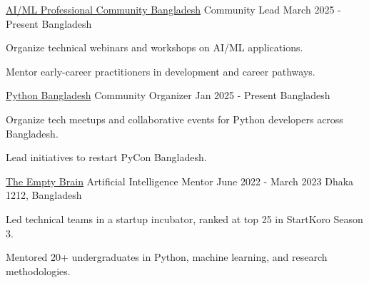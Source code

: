 


\begin{cventries}
\cventry
    {\href{https://aimlcommunity.pythonbd.org/}{AI/ML Professional Community Bangladesh}} %
    {Community Lead} %
    {March 2025 - Present} %
    {Bangladesh} %
    {
      \begin{cvitems} %
        \item{Organize technical webinars and workshops on AI/ML applications.}
        \item{Mentor early-career practitioners in development and career pathways.}
      \end{cvitems}
    }

  \cventry
    {\href{https://pythonbd.org/}{Python Bangladesh}} %
    {Community Organizer} %
    {Jan 2025 - Present} %
    {Bangladesh} %
    {
      \begin{cvitems} %
        \item{Organize tech meetups and collaborative events for Python developers across Bangladesh.}
        \item{Lead initiatives to restart PyCon Bangladesh.}
      \end{cvitems}
    }

  \cventry
    {\href{https://empty-brain.github.io/}{The Empty Brain}} %
    {Artificial Intelligence Mentor} %
    {June 2022 - March 2023} %
    {Dhaka 1212, Bangladesh} %
    {
      \begin{cvitems} %
        \item{Led technical teams in a startup incubator, ranked at top 25 in StartKoro Season 3.}
        \item{Mentored 20+ undergraduates in Python, machine learning, and research methodologies.}
      \end{cvitems}
    }    


\end{cventries}
